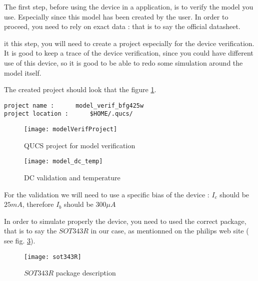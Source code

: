 
The first step, before using the device in a application, is to verify the model you use. Especially since this model has been created by the user. In order to proceed, you need to rely on exact data : that is to say the official datasheet. 

it this step, you will need to create a project especially for the device verification. It is good to keep a trace of the device verification, since you could have different use of this device, so it is good to be able to redo some simulation around the model itself.

The created project should look that the figure \ref{design:pa:model:project}.

\begin{verbatim}
project name : 		model_verif_bfg425w
project location :		$HOME/.qucs/ 
\end{verbatim}

\begin{figure}[htbp]
\begin{center}
	\texttt{[image: modelVerifProject]}
	\caption{QUCS project for model verification}
	\label{design:pa:model:project}
\end{center}
\end{figure}

\begin{figure}[htbp]
\begin{center}
	\texttt{[image: model\_dc\_temp]}
	\caption{DC validation and temperature}
	\label{design:pa:model:dcTemp}
\end{center}
\end{figure}

For the validation we will need to use a specific bias of the device : $I_c$ should be $25 mA$, therefore $I_b$ should be $300 \mu A$


In order to simulate properly the device, you need to used the correct package, that is to say the $SOT343R$ in our case, as mentionned on the philips web site ( see fig. \ref{design:pa:model:sotDesc}).

\begin{figure}[htbp]
\begin{center}
	\texttt{[image: sot343R]}
	\caption{$SOT343R$ package description}
	\label{design:pa:model:sotDesc}
\end{center}
\end{figure}

